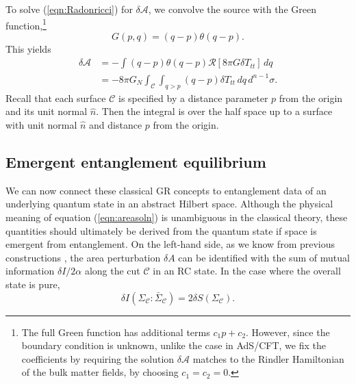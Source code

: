 \documentclass[%
preprint,
nofootinbib,
amsmath,amssymb,
aps,
prd,
showpacs,
superscriptaddress
]{revtex4-1}
\newcommand{\R}{\mathscr{R}}
\newcommand{\region}{\Sigma}
\newcommand{\area}{\mathcal{A}}
\DeclareMathOperator{\co}{:}
\begin{document}
To solve (\ref{eqn:Radonricci}) for $\delta \area$, we convolve the source with the Green function,\footnote{The full Green function has additional terms $c_1p+c_2$. However, since the boundary condition is unknown, unlike the case in AdS/CFT, we fix the coefficients by requiring the solution $\delta \area$ matches to the Rindler Hamiltonian of the bulk matter fields, by choosing $c_1=c_2=0$. }
\begin{equation}
G(p,q) = (q-p)\theta(q-p).
\end{equation}
This yields
\begin{align}
\delta \area &=- \int  (q-p)\theta(q-p) \R[8\pi G \delta T_{tt}] \, dq\\
&=-8\pi G_N\int_{\mathcal{C}}\int_{q>p} (q-p)\delta T_{tt}\, dq\, d^{n-1}\sigma.
\label{eqn:areasoln}
\end{align}
Recall that each surface  $\mathcal{C}$ is specified by a distance parameter $p$ from the origin and its unit normal $\hat{n}$. Then the integral is over the half space up to a surface with unit normal $\hat{n}$ and distance $p$ from the origin. 

\subsection{Emergent entanglement equilibrium}

We can now connect these classical GR concepts to entanglement data of an underlying quantum state in an abstract Hilbert space.
Although the physical meaning of equation (\ref{eqn:areasoln}) is unambiguous in the classical theory, these quantities should ultimately be derived from the quantum state if space is emergent from entanglement. On the left-hand side, as we know from previous constructions \cite{Cao:2016mst}, the area perturbation $\delta A$ can be identified with the sum of mutual information $\delta I/2\alpha$ along the cut $\mathcal{C}$ in an RC state. In the case where the overall state is pure, 
\begin{equation}
\delta I({\region}_{\mathcal{C}}\co \bar{{\region}}_{\mathcal{C}}) = 2\delta S({\region}_{\mathcal{C}}).
\end{equation}
\end{document}
